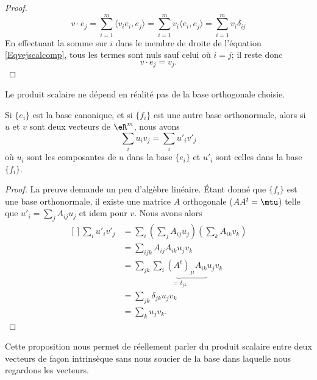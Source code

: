 \begin{proof}
	\begin{equation}		\label{Eqvejscalcomp}
		v\cdot e_j=\sum_{i=1}^m\langle v_ie_i, e_j\rangle =\sum_{i=1}^mv_i\langle e_i, e_j\rangle =\sum_{i=1}^mv_i\delta_{ij}
	\end{equation}
	En effectuant la somme sur $i$ dans le membre de droite de l'équation \eqref{Eqvejscalcomp}, tous les termes sont nuls sauf celui où $i=j$; il reste donc
	\begin{equation}
		v\cdot e_j=v_j.
	\end{equation}
\end{proof}

Le produit scalaire ne dépend en réalité pas de la base orthogonale choisie. 

\begin{lemma}
	Si $\{ e_i \}$ est la base canonique, et si $\{ f_i \}$ est une autre base orthonormale, alors si $u$ et $v$ sont deux vecteurs de $\eR^m$, nous avons
	\begin{equation}
		\sum_i u_iv_j=\sum_iu'_iv'_j
	\end{equation}
	où $u_i$ sont les composantes de $u$ dans la base $\{ e_i \}$ et $u'_i$ sont celles dans la base $\{ f_i \}$.
\end{lemma}

\begin{proof}
	La preuve demande un peu d'algèbre linéaire. Étant donné que $\{ f_i \}$ est une base orthonormale, il existe une matrice $A$ orthogonale ($AA^t=\mtu$) telle que $u'_i=\sum_jA_{ij}u_j$ et idem pour $v$. Nous avons alors
	\begin{equation}
		\begin{aligned}[]
			\sum_iu'_iv'_j&=\sum_i\left( \sum_jA_{ij} u_j\right)\left( \sum_k A_{ik}v_k \right)\\
			&=\sum_{ijk}A_{ij}A_{ik}u_jv_k\\
			&=\sum_{jk}\underbrace{\sum_i(A^t)_{ji}A_{ik}}_{=\delta_{jk}}u_jv_k\\
			&=\sum_{jk}\delta_{jk}u_jv_k\\
			&=\sum_ku_jv_k.
		\end{aligned}
	\end{equation}	
\end{proof}

Cette proposition nous permet de réellement parler du produit scalaire entre deux vecteurs de façon intrinsèque sans nous soucier de la base dans laquelle nous regardons les vecteurs.

